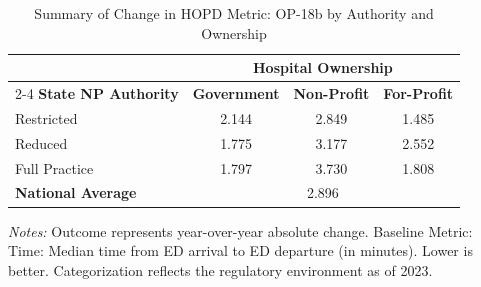 \begin{table}[htbp]
    \centering
    \caption{Summary of Change in HOPD Metric: OP-18b by Authority and Ownership}
    \label{tab:d_hopd_op_18b_own}
    \vspace{0.2cm}
    \begin{tabular}{lccc}
        \toprule
        & \multicolumn{3}{c}{\textbf{Hospital Ownership}} \\
        \cmidrule(lr){2-4}
        \textbf{State NP Authority} & \textbf{Government} & \textbf{Non-Profit} & \textbf{For-Profit} \\
        \midrule
        Restricted & 2.144 & 2.849 & 1.485 \\
        Reduced & 1.775 & 3.177 & 2.552 \\
        Full Practice & 1.797 & 3.730 & 1.808 \\
        \midrule
        \textbf{National Average} & \multicolumn{3}{c}{2.896} \\
        \bottomrule
    \end{tabular}
    \vspace{0.1cm}
    \begin{minipage}{0.85\textwidth}
        \footnotesize \textit{Notes:} Outcome represents year-over-year absolute change. Baseline Metric: Time: Median time from ED arrival to ED departure (in minutes). Lower is better. Categorization reflects the regulatory environment as of 2023.
    \end{minipage}
\end{table}